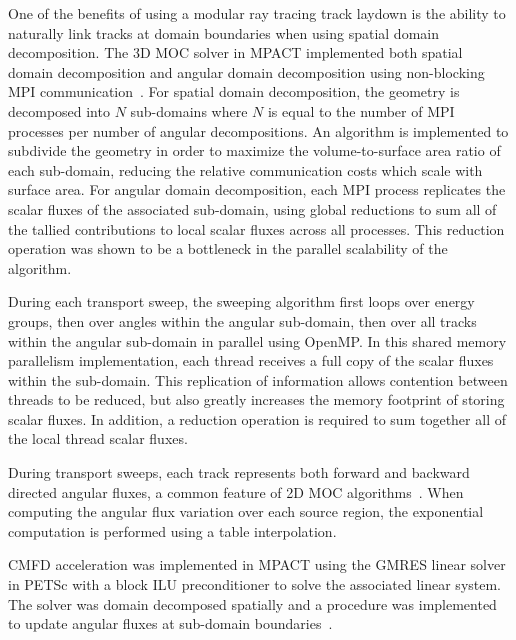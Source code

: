 One of the benefits of using a modular ray tracing track laydown is the ability to naturally link tracks at domain boundaries when using spatial domain decomposition. The 3D \ac{MOC} solver in MPACT implemented both spatial domain decomposition and angular domain decomposition using non-blocking \ac{MPI} communication~\cite{mpi}. For spatial domain decomposition, the geometry is decomposed into $N$ sub-domains where $N$ is equal to the number of \ac{MPI} processes per number of angular decompositions. An algorithm is implemented to subdivide the geometry in order to maximize the volume-to-surface area ratio of each sub-domain, reducing the relative communication costs which scale with surface area. For angular domain decomposition, each \ac{MPI} process replicates the scalar fluxes of the associated sub-domain, using global reductions to sum all of the tallied contributions to local scalar fluxes across all processes. This reduction operation was shown to be a bottleneck in the parallel scalability of the algorithm.

During each transport sweep, the sweeping algorithm first loops over energy groups, then over angles within the angular sub-domain, then over all tracks within the angular sub-domain in parallel using OpenMP. In this shared memory parallelism implementation, each thread receives a full copy of the scalar fluxes within the sub-domain. This replication of information allows contention between threads to be reduced, but also greatly increases the memory footprint of storing scalar fluxes. In addition, a reduction operation is required to sum together all of the local thread scalar fluxes.


During transport sweeps, each track represents both forward and backward directed angular fluxes, a common feature of 2D \ac{MOC} algorithms~\cite{kochunas2007twoway}. When computing the angular flux variation over each source region, the exponential computation is performed using a table interpolation.

\ac{CMFD} acceleration was implemented in MPACT using the \ac{GMRES} linear solver in PETSc with a block ILU preconditioner to solve the associated linear system. The solver was domain decomposed spatially and a procedure was implemented to update angular fluxes at sub-domain boundaries~\cite{mpact_dd_cmfd}.

